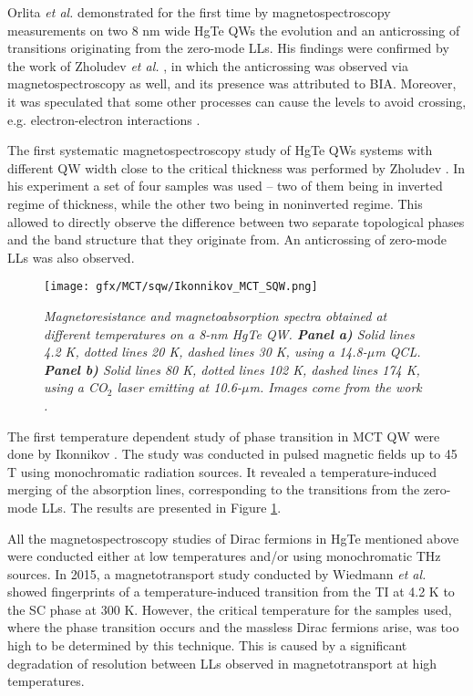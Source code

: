 \documentclass[titlepage,a4paper]{book}
\begin{document}
Orlita \textit{et al.} \cite{Orlita_MCT_QW} demonstrated for the first time by magnetospectroscopy measurements on two 8 nm wide HgTe QWs the evolution and an anticrossing of transitions originating from the zero-mode LLs. His findings were confirmed by the work of Zholudev \textit{et al.} \cite{Zholudev_MCT_QW_anticrossing}, in which the anticrossing was observed via magnetospectroscopy as well, and its presence was attributed to BIA. Moreover, it was speculated that some other processes can cause the levels to avoid crossing, e.g. electron-electron interactions \cite{Orlita_MCT_QW}.

The first systematic magnetospectroscopy study of HgTe QWs systems with different QW width close to the critical thickness was performed by Zholudev \cite{Zholudev_MCT_QW}. In his experiment a set of four samples was used -- two of them being in inverted regime of thickness, while the other two being in noninverted regime. This allowed to directly observe the difference between two separate topological phases and the band structure that they originate from. An anticrossing of zero-mode LLs was also observed.
\begin{figure}[ht]
	\centering
	\texttt{[image: gfx/MCT/sqw/Ikonnikov\_MCT\_SQW.png]}
	\vspace{-10pt}
	\caption{\textit{Magnetoresistance and magnetoabsorption spectra obtained at different temperatures on a 8-nm HgTe QW. \textbf{Panel a)} Solid lines 4.2 K, dotted lines 20 K, dashed lines 30 K, using a 14.8-$\mu$m QCL. \textbf{Panel b)} Solid lines 80 K, dotted lines 102 K, dashed lines 174 K, using a CO$_2$ laser emitting at 10.6-$\mu$m. Images come from the work \cite{Ikonnikov_MCT_SQW}.}}
	\label{fig:Ikonnikov_MCT_SQW}
\end{figure}

The first temperature dependent study of phase transition in MCT QW were done by Ikonnikov \cite{Ikonnikov_MCT_SQW}. The study was conducted in pulsed magnetic fields up to 45 T using monochromatic radiation sources. It revealed a temperature-induced merging of the absorption lines, corresponding to the transitions from the zero-mode LLs. The results are presented in Figure \ref{fig:Ikonnikov_MCT_SQW}.

All the magnetospectroscopy studies of Dirac fermions in HgTe mentioned above were conducted either at low temperatures and/or using monochromatic THz sources. In 2015, a magnetotransport study conducted by Wiedmann \textit{et al.} \cite{Wiedmann_State} showed fingerprints of a temperature-induced transition from the TI at 4.2 K to the SC phase at 300 K. However, the critical temperature for the samples used, where the phase transition occurs and the massless Dirac fermions arise, was too high to be determined by this technique. This is caused by a significant degradation of resolution between LLs observed in magnetotransport at high temperatures.
\end{document}
